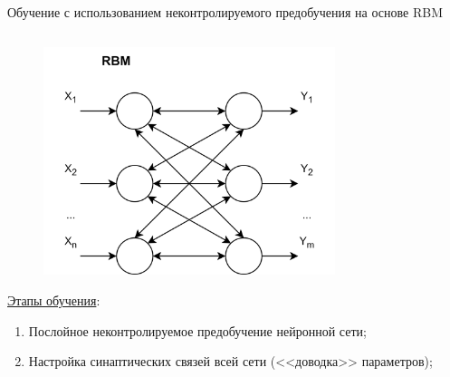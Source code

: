 \documentclass[10pt]{beamer}
\begin{document}
        \begin{frame}{Обучение с использованием неконтролируемого предобучения на основе RBM}
            \begin{columns}
                \begin{column}{0.5\textwidth}
                    \begin{figure}[H]
                        \centering
                        \includegraphics[width=0.8\textwidth]{pic1-3.png}
                    \end{figure}
                    \underline{Этапы обучения}:
                    \begin{enumerate}
                        \item Послойное неконтролируемое предобучение нейронной сети;
                        \item Настройка синаптических связей всей сети (<<доводка>> параметров);
                    \end{enumerate}
                \end{column}
                \begin{column}{0.5\textwidth}
                    \centering

\end{column}
\end{columns}
\end{frame}
\end{document}

